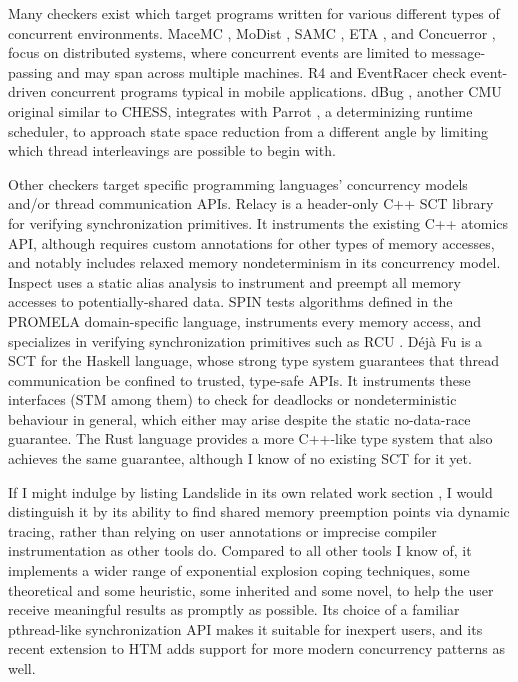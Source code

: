 Many checkers exist which target programs written for various different types of concurrent environments.
MaceMC \cite{macemc}, MoDist \cite{modist}, SAMC \cite{samc}, ETA \cite{dbug-retreat}, and Concuerror \cite{concuerror},
focus on distributed systems, where concurrent events are limited to message-passing and may span across multiple machines.
R4 \cite{r4} and EventRacer \cite{eventracer} check event-driven concurrent programs typical in mobile applications.
dBug \cite{dbug-ssv}, another CMU original similar to CHESS,
integrates with Parrot \cite{parrot}, a determinizing runtime scheduler,
to approach state space reduction from a different angle by limiting which thread interleavings are possible to begin with.

Other checkers target specific programming languages' concurrency models and/or thread communication APIs.
Relacy \cite{relacy} is a header-only C++ SCT library for verifying synchronization primitives.
It instruments the existing C++ atomics API,
although requires custom annotations for other types of memory accesses,
and notably includes relaxed memory nondeterminism in its concurrency model.
Inspect \cite{inspect} uses a static alias analysis to instrument and preempt all memory accesses to potentially-shared data.
SPIN \cite{spin} tests algorithms defined in the PROMELA domain-specific language,
instruments every memory access, and
specializes in verifying synchronization primitives such as RCU \cite{rcu}.
%
D\'{e}j\`{a} Fu \cite{dejafu} is a SCT
for the Haskell language,
whose strong type system guarantees that thread communication be confined to trusted, type-safe APIs.
It instruments these interfaces (STM among them)
to check for deadlocks or nondeterministic behaviour in general,
which either may arise despite the static no-data-race guarantee.
The Rust language \cite{rust-language}
provides a more C++-like type system that also
achieves the same guarantee, although I know of no existing SCT for it yet.

If I might indulge by listing Landslide in its own related work section \cite{this-thesis},
I would distinguish it by its ability to find shared memory preemption points via dynamic tracing,
rather than relying on user annotations or imprecise compiler instrumentation
as other tools do.
Compared to all other tools I know of,
it implements a wider range of exponential explosion coping techniques,
some theoretical and some heuristic,
some inherited and some novel,
to help the user receive meaningful results as promptly as possible.
Its choice of a familiar pthread-like synchronization API makes it suitable for inexpert users,
and its recent extension to HTM adds support for more modern concurrency patterns as well.

